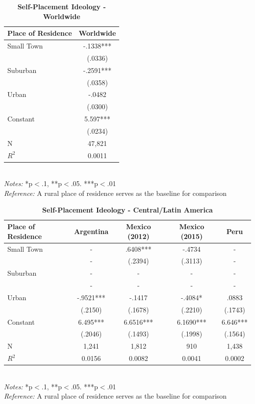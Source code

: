 \documentclass[12pt, titlepage]{article}
\newcommand\e{\emph}
\newcommand\tb{\textbf}
\begin{document}
\begin{table}
	\centering
	\def\arraystretch{1.5}
	\caption{\tb{Self-Placement Ideology - Worldwide}}
	\begin{tabulary}{\linewidth}{l c}
		\\
		\hline
		\tb{Place of Residence}&\tb{Worldwide} \\
		\hline
		Small Town&-.1338***  \\    
		  & (.0336)   \\
		Suburban & -.2591***\\ 
		 & (.0358) \\
		Urban   & -.0482   \\
		  & (.0300)    \\
		Constant   & 5.597***  \\
		&(.0234) \\
		N  & 47,821  \\
		$R^2$	& 0.0011 \\
		\hline                                       
    \end{tabulary}
\\
\e{Notes:} *p$<$.1, **p$<$.05. ***p$<$.01 \\
\e{Reference:} A rural place of residence serves as the baseline for comparison
\label{table3}
\end{table}

\begin{table}
\centering
\def\arraystretch{1.5}
\caption{\tb{Self-Placement Ideology - Central/Latin America}}
	\begin{tabulary}{\linewidth}{l c c c c}
	\\
	\hline
	\tb{Place of Residence}&\tb{Argentina}&\tb{Mexico (2012)}&\tb{Mexico (2015)} &\tb{Peru}\\
	\hline
	Small Town  & -    & .6408***   &-.4734    & -   \\      
	  & -  & (.2394) & (.3113)    & -    \\
	Suburban    & -    & -   & -   & -    \\ 
	& -     & -    & -   & -    \\
	Urban   & -.9521*** & -.1417   & -.4084*   & .0883  \\
	   & (.2150)   &(.1678)   & (.2210)  & (.1743)      \\
	Constant   & 6.495*** & 6.6516*** & 6.1690*** & 6.646***   \\
	&(.2046)&(.1493)&(.1998)&(.1564) \\
	N  & 1,241 &1,812   & 910 & 1,438   \\
	$R^2$ & 0.0156   &0.0082   &0.0041 &0.0002     \\
	\hline                                       
	\end{tabulary} 
\\
\e{Notes:} *p$<$.1, **p$<$.05. ***p$<$.01 \\
\e{Reference:} A rural place of residence serves as the baseline for comparison
\label{table4}
\end{table}
\end{document}
